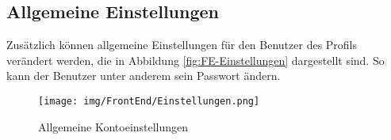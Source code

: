 \subsection{Allgemeine Einstellungen}
Zusätzlich können allgemeine Einstellungen für den Benutzer des Profils verändert werden, die in Abbildung \vref{fig:FE-Einstellungen} dargestellt sind.
So kann der Benutzer unter anderem sein Passwort ändern.
\begin{figure}[H]
	\centering 
	\texttt{[image: img/FrontEnd/Einstellungen.png]}
	\caption[Allgemeine Kontoeinstellungen]{\label{fig:FE-Einstellungen}Allgemeine Kontoeinstellungen}
\end{figure}
